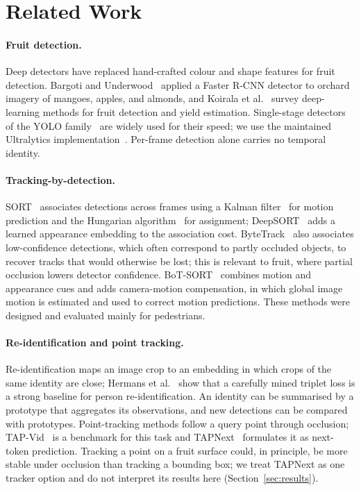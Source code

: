 \documentclass[11pt]{article}
\begin{document}
\section{Related Work}
\label{sec:related}

\paragraph{Fruit detection.} Deep detectors have replaced hand-crafted colour and shape features for fruit detection. Bargoti and Underwood~\cite{bargoti2017} applied a Faster R-CNN detector to orchard imagery of mangoes, apples, and almonds, and Koirala et al.~\cite{koirala2019} survey deep-learning methods for fruit detection and yield estimation. Single-stage detectors of the YOLO family~\cite{redmon2016} are widely used for their speed; we use the maintained Ultralytics implementation~\cite{ultralytics2024}. Per-frame detection alone carries no temporal identity.

\paragraph{Tracking-by-detection.} SORT~\cite{bewley2016} associates detections across frames using a Kalman filter~\cite{kalman1960} for motion prediction and the Hungarian algorithm~\cite{kuhn1955} for assignment; DeepSORT~\cite{wojke2017} adds a learned appearance embedding to the association cost. ByteTrack~\cite{zhang2022} also associates low-confidence detections, which often correspond to partly occluded objects, to recover tracks that would otherwise be lost; this is relevant to fruit, where partial occlusion lowers detector confidence. BoT-SORT~\cite{aharon2022} combines motion and appearance cues and adds camera-motion compensation, in which global image motion is estimated and used to correct motion predictions. These methods were designed and evaluated mainly for pedestrians.

\paragraph{Re-identification and point tracking.} Re-identification maps an image crop to an embedding in which crops of the same identity are close; Hermans et al.~\cite{hermans2017} show that a carefully mined triplet loss is a strong baseline for person re-identification. An identity can be summarised by a prototype that aggregates its observations, and new detections can be compared with prototypes. Point-tracking methods follow a query point through occlusion; TAP-Vid~\cite{doersch2022} is a benchmark for this task and TAPNext~\cite{zholus2025} formulates it as next-token prediction. Tracking a point on a fruit surface could, in principle, be more stable under occlusion than tracking a bounding box; we treat TAPNext as one tracker option and do not interpret its results here (Section~\ref{sec:results}).
\end{document}
